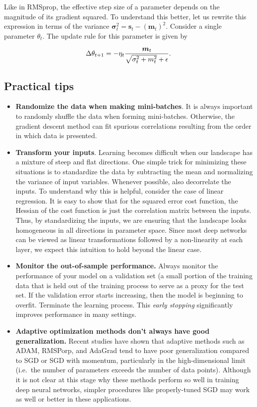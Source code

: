 \documentclass[%
oneside,                 %
final,                   %
10pt]{article}
\begin{document}
Like in RMSprop, the effective step size of a parameter depends on the
magnitude of its gradient squared.  To understand this better, let us
rewrite this expression in terms of the variance
$\boldsymbol{\sigma}_t^2 = \bm{\mathbf{s}}_t -
(\bm{\mathbf{m}}_t)^2$. Consider a single parameter $\theta_t$. The
update rule for this parameter is given by

\[
\Delta \theta_{t+1}= -\eta_t { \bm{m}_t \over \sqrt{\sigma_t^2 +  m_t^2 }+\epsilon}.
\]




\subsection*{Practical tips}

\begin{itemize}
\item \textbf{Randomize the data when making mini-batches}. It is always important to randomly shuffle the data when forming mini-batches. Otherwise, the gradient descent method can fit spurious correlations resulting from the order in which data is presented.

\item \textbf{Transform your inputs}. Learning becomes difficult when our landscape has a mixture of steep and flat directions. One simple trick for minimizing these situations is to standardize the data by subtracting the mean and normalizing the variance of input variables. Whenever possible, also decorrelate the inputs. To understand why this is helpful, consider the case of linear regression. It is easy to show that for the squared error cost function, the Hessian of the cost function is just the correlation matrix between the inputs. Thus, by standardizing the inputs, we are ensuring that the landscape looks homogeneous in all directions in parameter space. Since most deep networks can be viewed as linear transformations followed by a non-linearity at each layer, we expect this intuition to hold beyond the linear case.

\item \textbf{Monitor the out-of-sample performance.} Always monitor the performance of your model on a validation set (a small portion of the training data that is held out of the training process to serve as a proxy for the test set. If the validation error starts increasing, then the model is beginning to overfit. Terminate the learning process. This \emph{early stopping} significantly improves performance in many settings.

\item \textbf{Adaptive optimization methods don't always have good generalization.} Recent studies have shown that adaptive methods such as ADAM, RMSPorp, and AdaGrad tend to have poor generalization compared to SGD or SGD with momentum, particularly in the high-dimensional limit (i.e.~the number of parameters exceeds the number of data points). Although it is not clear at this stage why these methods perform so well in training deep neural networks, simpler procedures like properly-tuned SGD may work as well or better in these applications.
\end{itemize}
\end{document}
